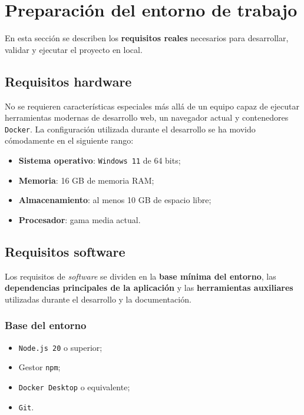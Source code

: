 \section{Preparación del entorno de trabajo}

En esta sección se describen los \textbf{requisitos reales} necesarios para desarrollar, validar y ejecutar el proyecto en local.

\subsection{Requisitos hardware}

No se requieren características especiales más allá de un equipo capaz de ejecutar herramientas modernas de desarrollo web, un navegador actual y contenedores \texttt{Docker}. La configuración utilizada durante el desarrollo se ha movido cómodamente en el siguiente rango:

\begin{itemize}
    \item \textbf{Sistema operativo}: \texttt{Windows 11} de 64 bits;
    \item \textbf{Memoria}: 16 GB de memoria RAM;
    \item \textbf{Almacenamiento}: al menos 10 GB de espacio libre;
    \item \textbf{Procesador}: gama media actual.
\end{itemize}

\subsection{Requisitos software}

Los requisitos de \textit{software} se dividen en la \textbf{base mínima del entorno}, las \textbf{dependencias principales de la aplicación} y las \textbf{herramientas auxiliares} utilizadas durante el desarrollo y la documentación.

\subsubsection*{Base del entorno}

\begin{itemize}
    \item \texttt{Node.js 20} o superior;
    \item Gestor \texttt{npm};
    \item \texttt{Docker Desktop} o equivalente;
    \item \texttt{Git}.
\end{itemize}


